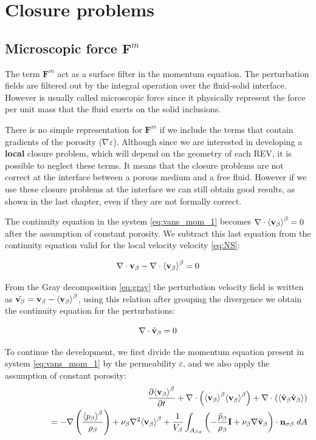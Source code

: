 \section{Closure problems}

\subsection{Microscopic force $\mathbf{F}^m$}
\label{ch:closure_fm}
The term $\mathbf{F}^m$ act as a surface filter in the momentum equation. The perturbation fields are filtered out by the integral operation over the fluid-solid interface. However is usually called microscopic force since it physically represent the force per unit mass that the fluid exerts on the solid inclusions.

There is no simple representation for $\mathbf{F}^m$ if we include the terms that contain gradients of the porosity ($\nabla \varepsilon$).
Although since we are interested in developing a \textbf{local} closure problem, which will depend on the geometry of each REV, it is possible to neglect these terms.
It means that the closure problems are not correct at the interface between a porous medium and a free fluid. 
However if we use these closure problems at the interface we can still obtain good results, as shown in the last chapter, even if they are not formally correct.

The continuity equation in the system \eqref{eq:vans_mom_1} becomes $ \nabla \cdot  {\left< \textbf{v}_{\beta}\right>}^{\beta}=0$ after the assumption of constant porosity.
We subtract this last equation from the continuity equation valid for the local velocity velocity \eqref{eq:NS}:

$$
\nabla \cdot  \textbf{v}_{\beta} - \nabla \cdot  {\left< \textbf{v}_{\beta}\right>}^{\beta} = 0
$$

From the Gray decomposition \eqref{eq:gray} the perturbation velocity field is written as $\tilde{\textbf{v}_{\beta}} = \textbf{v}_{\beta} - {\left< \textbf{v}_{\beta} \right>}^{\beta}$, using this relation after grouping the divergence we obtain the continuity equation for the perturbations:

\begin{equation}
\nabla \cdot \tilde{\textbf{v}}_{\beta} = 0 
\end{equation}


To continue the development, we first divide the momentum equation present in system \ref{eq:vans_mom_1} by the permeability $\varepsilon$, and we also apply the assumption of constant porosity:
\begin{eqnarray}
&& \dfrac{\partial {\left< \textbf{v}_{\beta}\right>}^{\beta}}{\partial t} + \nabla \cdot \left({\left< \textbf{v}_{\beta} \right>}^{\beta}{\left< \textbf{v}_{\beta} \right>}^{\beta}\right)   + \nabla \cdot \left({\left< \tilde{\textbf{v}}_{\beta} \tilde{\textbf{v}}_{\beta} \right>}\right)   \nonumber \\
&& \qquad \qquad = - \nabla \left(\dfrac{{\left< p_{\beta} \right>}^{\beta}}{\rho_{\beta}}\right) + \nu_{\beta}  \nabla^2 {\left< \textbf{v}_{\beta} \right>}^{\beta} + \dfrac{1}{V_\beta} \displaystyle\int_{A_{\beta \sigma}} \left(-\dfrac{\tilde{p}_{\beta}}{\rho_{\beta}} \mathbf{I}  + \nu_{\beta} \nabla \tilde{\textbf{v}}_{\beta} \right)\cdot \mathbf{n}_{\sigma \beta} \;dA  \nonumber
\end{eqnarray}



